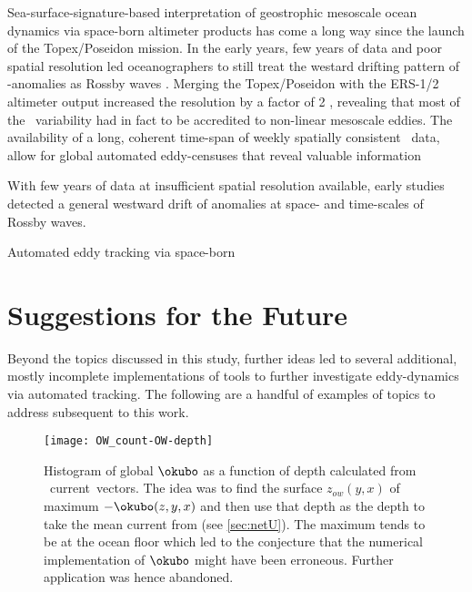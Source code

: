 \label{sec:futureTopics}

Sea-surface-signature-based interpretation of geostrophic mesoscale ocean dynamics via space-born altimeter products has come a long way since the launch of the Topex/Poseidon mission. In the early years, few years of data and poor spatial resolution led oceanographers to still treat the westard drifting pattern of \SSH-anomalies as Rossby waves \citep{matano1993seasonal,cipollini1997concurrent,le1993sea,Killworth1997a}.
Merging the Topex/Poseidon with the ERS-1/2 altimeter output increased the resolution by a factor of 2 \citep{Chelton2007}, revealing that most of the \SSH~variability had in fact to be accredited to non-linear mesoscale eddies. The availability of a long, coherent time-span of weekly spatially consistent \SSH~data, allow for global automated eddy-censuses that reveal valuable information





With few years of data at insufficient spatial resolution available, early studies
detected a general westward drift of anomalies at space- and time-scales of Rossby waves.


Automated eddy tracking via space-born












\section{Suggestions for the Future}
Beyond the topics discussed in this study, further ideas led to several additional, mostly incomplete implementations of tools to further investigate eddy-dynamics via automated tracking. The following are a handful of examples of topics to address subsequent to this work.

\begin{figure}
	\texttt{[image: OW\_count-OW-depth]}
	\caption{Histogram of global $\okubo$ as a function of depth calculated from \POP~current~vectors. The idea was to find the surface $z_{ow}(y,x)$ of maximum $-\okubo(z,y,x)$ and then use that depth as the depth to take the mean current from (see \cref{sec:netU}). The maximum tends to be at the ocean floor which led to the conjecture that the numerical implementation of $\okubo$ might have been erroneous. Further application was hence abandoned.  }
	\label{fig:OW_count-OW-depth}
\end{figure}


